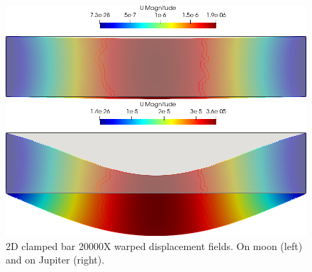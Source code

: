 \begin{figure}[htbp]
    \centering
    \begin{minipage}[t][2.5cm][t]{0.4\textwidth}
    \includegraphics[align=t,width=1\textwidth]{./Images/le-2d-bar-moon.png}
    \end{minipage}\hspace{.1\textwidth}
    \begin{minipage}[t][2.5cm][t]{0.4\textwidth}
    \includegraphics[align=t,width=1\textwidth]{./Images/le-2d-bar-Jupiter.png}
    \end{minipage}
    \caption{2D clamped bar 20000X warped displacement fields. On moon (left) and  on Jupiter (right).}
    \label{fig:moon-jupiter}
\end{figure}
